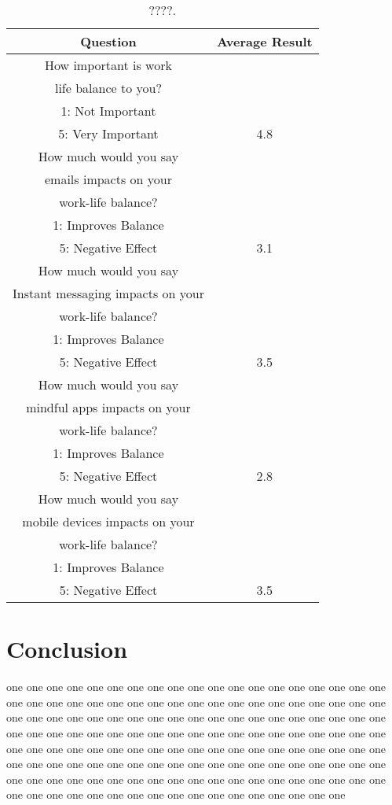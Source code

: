 \documentclass{sigchi}
\begin{document}
\begin{table}[ht]
	\centering
	\begin{tabular}[t]{ |c| c | }
		\hline
		Question & Average Result  \\ 
		\hline
		How important is work & \\
		life balance to you? & \\
		1: Not Important & \\
		5: Very Important & 4.8 \\ 
		\hline
		How much would you say & \\
		emails impacts on your & \\
		work-life balance? & \\
		1: Improves Balance & \\
		5: Negative Effect & 3.1  \\ 
		\hline
		How much would you say & \\
		Instant messaging impacts on your & \\
		work-life balance? & \\
		1: Improves Balance & \\
		5: Negative Effect & 3.5 \\
		\hline
		How much would you say & \\
		mindful apps impacts on your & \\
		work-life balance? & \\
		1: Improves Balance & \\
		5: Negative Effect & 2.8 \\
		\hline
		How much would you say & \\
		mobile devices impacts on your & \\
		work-life balance? & \\
		1: Improves Balance & \\
		5: Negative Effect & 3.5 \\
		\hline
	\end{tabular}
	\caption{????.}
	\label{tab:general_qs}
\end{table}%


\section{Conclusion}
	 
	one one one one one one one one one one one one one one one one one one one one one one one one one one one one one one one one one one one one one one one one one one one one one one one one one one one one one one one one one one one one one one one one one one one one one one one one one one one one one one one one one one one one one one one one one one one one one one one one one one one one one one one one one one one one one one one one one one one one one one one one one one one one one one one one one one one one one one one one one one one one one one one one one one one one one one 
	
\balance{}



\end{document}
